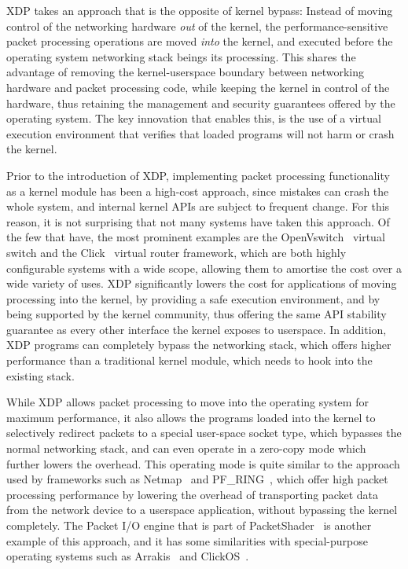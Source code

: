 \documentclass[sigconf]{acmart}
\begin{document}
XDP takes an approach that is the opposite of kernel bypass: Instead of moving
control of the networking hardware \emph{out} of the kernel, the
performance-sensitive packet processing operations are moved \emph{into} the
kernel, and executed before the operating system networking stack beings its
processing. This shares the advantage of removing the kernel-userspace boundary
between networking hardware and packet processing code, while keeping the kernel
in control of the hardware, thus retaining the management and security
guarantees offered by the operating system. The key innovation that enables
this, is the use of a virtual execution environment that verifies that loaded
programs will not harm or crash the kernel.

Prior to the introduction of XDP, implementing packet processing functionality
as a kernel module has been a high-cost approach, since mistakes can crash the
whole system, and internal kernel APIs are subject to frequent change. For this
reason, it is not surprising that not many systems have taken this approach. Of
the few that have, the most prominent examples are the
OpenVswitch~\cite{openvswitch} virtual switch and the
Click~\cite{morris1999click} virtual router framework, which are both highly
configurable systems with a wide scope, allowing them to amortise the cost over
a wide variety of uses. XDP significantly lowers the cost for applications of
moving processing into the kernel, by providing a safe execution environment,
and by being supported by the kernel community, thus offering the same API
stability guarantee as every other interface the kernel exposes to userspace. In
addition, XDP programs can completely bypass the networking stack, which offers
higher performance than a traditional kernel module, which needs to hook into
the existing stack.

While XDP allows packet processing to move into the operating system for maximum
performance, it also allows the programs loaded into the kernel to selectively
redirect packets to a special user-space socket type, which bypasses the normal
networking stack, and can even operate in a zero-copy mode which further lowers
the overhead. This operating mode is quite similar to the approach used by
frameworks such as Netmap~\cite{rizzo2012netmap} and
PF\_RING~\cite{deri2009modern}, which offer high packet processing performance
by lowering the overhead of transporting packet data from the network device to
a userspace application, without bypassing the kernel completely. The Packet I/O
engine that is part of PacketShader~\cite{han2010packetshader} is another
example of this approach, and it has some similarities with special-purpose
operating systems such as Arrakis~\cite{peter2016arrakis} and
ClickOS~\cite{martins2014clickos}.
\end{document}
